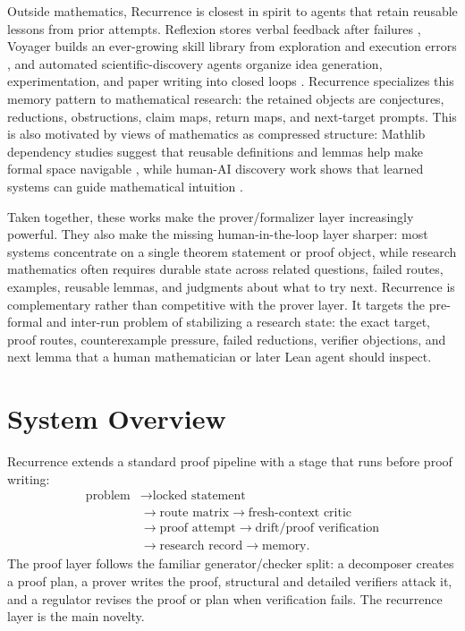 \documentclass{article}
\theoremstyle{definition}
\theoremstyle{remark}
\begin{document}
Outside mathematics, Recurrence is closest in spirit to agents that retain reusable lessons from prior attempts. Reflexion stores verbal feedback after failures \citep{shinn2023reflexion}, Voyager builds an ever-growing skill library from exploration and execution errors \citep{wang2023voyager}, and automated scientific-discovery agents organize idea generation, experimentation, and paper writing into closed loops \citep{lu2024aiscientist}. Recurrence specializes this memory pattern to mathematical research: the retained objects are conjectures, reductions, obstructions, claim maps, return maps, and next-target prompts. This is also motivated by views of mathematics as compressed structure: Mathlib dependency studies suggest that reusable definitions and lemmas help make formal space navigable \citep{aksenov2026compression,li2026networkmathlib}, while human-AI discovery work shows that learned systems can guide mathematical intuition \citep{davies2021advancing}.

Taken together, these works make the prover/formalizer layer increasingly powerful. They also make the missing human-in-the-loop layer sharper: most systems concentrate on a single theorem statement or proof object, while research mathematics often requires durable state across related questions, failed routes, examples, reusable lemmas, and judgments about what to try next. Recurrence is complementary rather than competitive with the prover layer. It targets the pre-formal and inter-run problem of stabilizing a research state: the exact target, proof routes, counterexample pressure, failed reductions, verifier objections, and next lemma that a human mathematician or later Lean agent should inspect.

\section{System Overview}

Recurrence extends a standard proof pipeline with a stage that runs before proof writing:
\[
\begin{aligned}
\text{problem} &\to \text{locked statement}\\
&\to \text{route matrix} \to \text{fresh-context critic}\\
&\to \text{proof attempt} \to \text{drift/proof verification}\\
&\to \text{research record} \to \text{memory}.
\end{aligned}
\]
The proof layer follows the familiar generator/checker split: a decomposer creates a proof plan, a prover writes the proof, structural and detailed verifiers attack it, and a regulator revises the proof or plan when verification fails. The recurrence layer is the main novelty.
\end{document}

